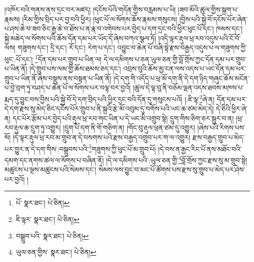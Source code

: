 །འཁོར་བའི་གནས་ནས་དྲང་བར་མཛད། །དངོས་པོའི་གདོན་གྱིས་བརླམས་པ་ཡི། །ཟབ་མོའི་ཚུལ་གྱིས་སྐྲག་པ་རྣམས། །རིམ་གྱིས་བྲིད་པར་བྱ་བའི་ཕྱིར། །ཕུང་པོ་ལ་སོགས་ཆོས་རྣམས་གསུངས། །བྱིས་པའི་སྐྱེ་བོ་དངོས་པོར་ཞེན་པ་ཤས་ཆེ་བ་ཟབ་ཅིང་རྒྱ་ཆེ་བ་ཐོས་པ་ན་རྣ་བ་འགེབས་པར་བྱེད་པ་དག་དྲང་བའི་ཕྱིར་ཕུང་པོ་དང་། ཁམས་དང་། སྐྱེ་མཆེད་ལ་སོགས་པའི་ཆོས་དོན་དམ་པར་ཡོད་དོ་ཞེས་བཀའ་སྩལ་ཏོ། །འདི་ལྟར་རྡུལ་ཕྲ་རབ་འདུས་པའི་ངོ་བོ་ལས། གཟུགས་དང་། དྲི་དང་། རོ་དང་། རེག་པ་དང་། འབྱུང་བ་ཆེན་པོ་བཞི་སྟེ་རྫས་བརྒྱད་འདུས་པ་ལ་གཟུགས་ཀྱི་ཕུང་:པོ་དང་། \footnote{པོ་  སྣར་ཐང་།  པེ་ཅིན། }དོན་དམ་པར་གྲུབ་པ་ཡིན་ལ། དེ་ལ་དམིགས་པ་ཅན་ཡུལ་ཅན་གྱི་བློ་གྲོས་ཀྱང་དོན་དམ་པར་གྲུབ་པ་ཡིན་ནོ། །དེ་གྲུབ་པས་ལམ་གྱི་ཆོས་ཐམས་ཅད་དང་། འབྲས་བུའི་ཆོས་མྱ་ངན་ལས་འདས་པ་ཡང་དོན་དམ་པར་གྲུབ་པ་ཡིན་ནོ་ཞེས་བསྡུས་ནས་བསྟན་པ་ཡིན་ནོ། །དེ་དག་གི་འདོད་པ་ཕྲ་མོ་དག་ནི་དེ་དག་ཉིད་གཞུང་ཆོས་མངོན་པ་བྱེ་བྲག་ཏུ་བཤད་པ་ཆེན་པོ་ལ་སོགས་པར་བལྟ་བར་བྱའོ། །ཚུལ་དེ་ལྟ་བུ་ནི་བཅོམ་ལྡན་འདས་ཐབས་མཁས་པ་རྨད་དུ་བྱུང་བས་བྱིས་པའི་སྐྱེ་བོ་དེ་དག་བྲིད་པའི་ཕྱིར་དྲང་བའི་དོན་དུ་གསུངས་པའོ། །:ཇི་ལྟ་\footnote{ཇི་ལྟར་  སྣར་ཐང་།  པེ་ཅིན། }ཞེ་ན། དོན་དམ་པར་དེ་དག་རྫས་སུ་མེད་ཅིང་དངོས་པོར་གྲུབ་པ་ནི་སྐྲའི་རྩེ་མོ་འབུམ་དུ་བགོས་པའི་ཡང་ཆ་ཙམ་མེད་དེ། དེ་ཅིའི་ཕྱིར་ཞེ་ན། དང་པོར་རྩོམ་པར་བྱེད་པའི་རྡུལ་ཕྲ་རབ་གང་ཡིན་པ་དེ་ཡང་མི་འགྲུབ་སྟེ། དྲུག་གིས་ཅིག་ཅར་སྦྱར་བ་ན། །ཕྲ་རབ་རྡུལ་ཆ་དྲུག་ཏུ་འགྱུར། །དྲུག་པོ་དག་ནི་གོ་གཅིག་ན། །གོང་བུ་རྡུལ་ཕྲན་ཙམ་དུ་འགྱུར། །ཞེས་པའི་རིགས་པས་སོ། །དེ་ལྟར་རྡུལ་ཕྲ་རབ་མ་གྲུབ་ན་དེ་བསགས་པའི་རྫས་བརྒྱད་འགྲུབ་པར་ག་ལ་འགྱུར། རྫས་བརྒྱད་གྲུབ་པ་མེད་པར་གྱུར་ན་དེ་དག་གིས་:བསྒྲུབས་པའི་\footnote{བསྒྲུབ་པའི་  སྣར་ཐང་།  པེ་ཅིན། }གཟུགས་ཀྱི་ཕུང་པོ་མ་གྲུབ་པོ། །དེ་བས་ན་རྒྱང་རིང་པོ་ནས་མཐོང་བའི་དམག་དང་ནགས་ཚལ་ལ་སོགས་པ་བཞིན་ནོ། །དེ་ལ་དམིགས་པའི་:ཡུལ་ཅན་གྱི་\footnote{ཡུལ་ཅན་གྱིས་  སྣར་ཐང་།  པེ་ཅིན། }བློ་གྲོས་ཀྱང་རྫས་སུ་མ་གྲུབ་སྟེ། མཚུངས་པ་ལྔས་མཚུངས་པའི་སེམས་དང་། སེམས་ལས་བྱུང་བ་མང་པོ་ཚོགས་པས་རྫས་སུ་གྲུབ་པ་མེད་པར་ཤེས་པར་བྱའོ། །
